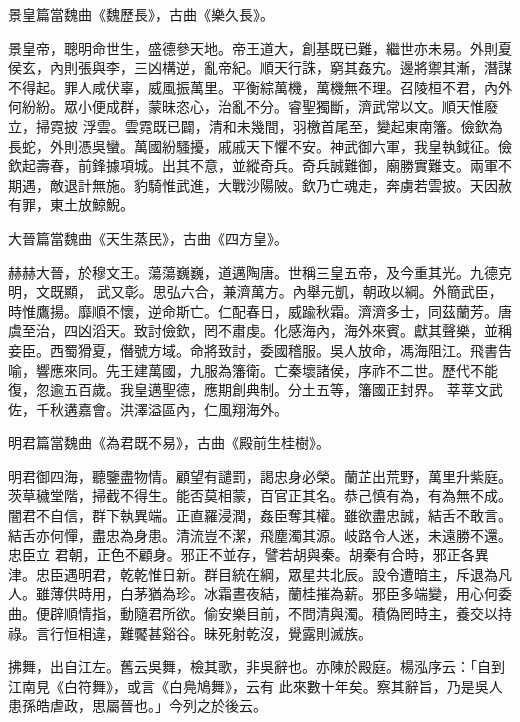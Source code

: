 \begin{pinyinscope}
 景皇篇當魏曲《魏歷長》，古曲《樂久長》。



 景皇帝，聰明命世生，盛德參天地。帝王道大，創基既已難，繼世亦未易。外則夏侯玄，內則張與李，三凶構逆，亂帝紀。順天行誅，窮其姦宄。邊將禦其漸，潛謀不得起。罪人咸伏辜，威風振萬里。平衡綜萬機，萬機無不理。召陵桓不君，內外何紛紛。眾小便成群，蒙昧恣心，治亂不分。睿聖獨斷，濟武常以文。順天惟廢立，掃霓披
 浮雲。雲霓既已闢，清和未幾間，羽檄首尾至，變起東南籓。儉欽為長蛇，外則憑吳蠻。萬國紛騷擾，戚戚天下懼不安。神武御六軍，我皇執鉞征。儉欽起壽春，前鋒據項城。出其不意，並縱奇兵。奇兵誠難御，廟勝實難支。兩軍不期遇，敵退計無施。豹騎惟武進，大戰沙陽陂。欽乃亡魂走，奔虜若雲披。天因赦有罪，東土放鯨鯢。



 大晉篇當魏曲《天生蒸民》，古曲《四方皇》。



 赫赫大晉，於穆文王。蕩蕩巍巍，道邁陶唐。世稱三皇五帝，及今重其光。九德克明，文既顯，
 武又彰。思弘六合，兼濟萬方。內舉元凱，朝政以綱。外簡武臣，時惟鷹揚。靡順不懷，逆命斯亡。仁配春日，威踰秋霜。濟濟多士，同茲蘭芳。唐虞至治，四凶滔天。致討儉欽，罔不肅虔。化感海內，海外來賓。獻其聲樂，並稱妾臣。西蜀猾夏，僭號方域。命將致討，委國稽服。吳人放命，馮海阻江。飛書告喻，響應來同。先王建萬國，九服為籓衛。亡秦壞諸侯，序祚不二世。歷代不能復，忽逾五百歲。我皇邁聖德，應期創典制。分土五等，籓國正封界。
 莘莘文武佐，千秋遘嘉會。洪澤溢區內，仁風翔海外。



 明君篇當魏曲《為君既不易》，古曲《殿前生桂樹》。



 明君御四海，聽鑒盡物情。顧望有譴罰，謁忠身必榮。蘭芷出荒野，萬里升紫庭。茨草穢堂階，掃截不得生。能否莫相蒙，百官正其名。恭己慎有為，有為無不成。闇君不自信，群下執異端。正直羅浸潤，姦臣奪其權。雖欲盡忠誠，結舌不敢言。結舌亦何憚，盡忠為身患。清流豈不潔，飛塵濁其源。岐路令人迷，未遠勝不還。忠臣立
 君朝，正色不顧身。邪正不並存，譬若胡與秦。胡秦有合時，邪正各異津。忠臣遇明君，乾乾惟日新。群目統在綱，眾星共北辰。設令遭暗主，斥退為凡人。雖薄供時用，白茅猶為珍。冰霜晝夜結，蘭桂摧為薪。邪臣多端變，用心何委曲。便辟順情指，動隨君所欲。偷安樂目前，不問清與濁。積偽罔時主，養交以持祿。言行恒相違，難饜甚谿谷。昧死射乾沒，覺露則滅族。



 拂舞，出自江左。舊云吳舞，檢其歌，非吳辭也。亦陳於殿庭。楊泓序云：「自到江南見《白符舞》，或言《白鳧鳩舞》，云有
 此來數十年矣。察其辭旨，乃是吳人患孫皓虐政，思屬晉也。」今列之於後云。




\end{pinyinscope}
